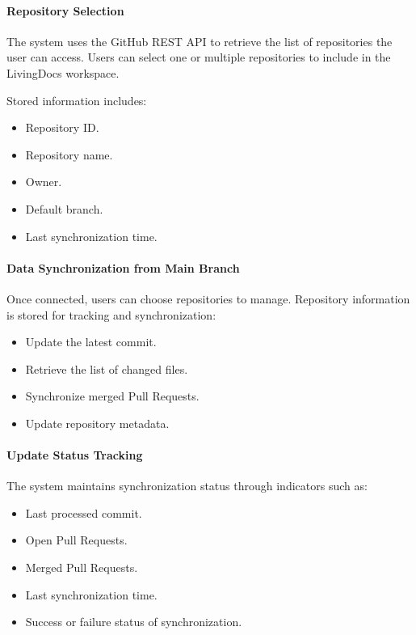 \paragraph{Repository Selection}

The system uses the GitHub REST API to retrieve the list of repositories the user can access. Users can select one or multiple repositories to include in the LivingDocs workspace.

Stored information includes:

\begin{itemize}
    \item Repository ID.
    \item Repository name.
    \item Owner.
    \item Default branch.
    \item Last synchronization time.
\end{itemize}

\paragraph{Data Synchronization from Main Branch}

Once connected, users can choose repositories to manage. Repository information is stored for tracking and synchronization:

\begin{itemize}
    \item Update the latest commit.
    \item Retrieve the list of changed files.
    \item Synchronize merged Pull Requests.
    \item Update repository metadata.
\end{itemize}

\paragraph{Update Status Tracking}

The system maintains synchronization status through indicators such as:

\begin{itemize}
    \item Last processed commit.
    \item Open Pull Requests.
    \item Merged Pull Requests.
    \item Last synchronization time.
    \item Success or failure status of synchronization.
\end{itemize}

